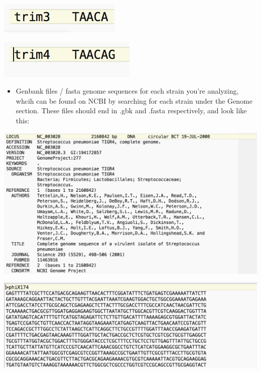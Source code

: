 \documentclass{article}
\begin{document}
\includegraphics[scale=0.5]{transbc3.png}

\includegraphics[scale=0.5]{transbc4.png}

\begin{itemize}

\item Genbank files / fasta genome sequences for each strain you're analyzing, whcih can be found on NCBI by searching for each strain under the Genome section. These files should end in .gbk and .fasta respectively, and look like this:

\end{itemize}

\includegraphics[scale=0.5]{gbk.png}

\vspace{2 mm}

\includegraphics[scale=0.5]{fasta.png}
\end{document}
